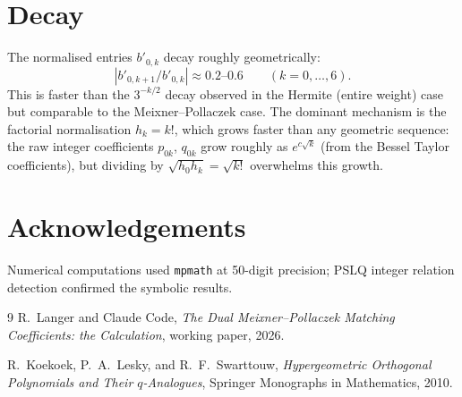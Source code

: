 \documentclass[11pt,a4paper]{article}
\begin{document}
\section{Decay}

The normalised entries $b'_{0,k}$ decay roughly geometrically:
\[
  |b'_{0,k+1}/b'_{0,k}| \approx 0.2\text{--}0.6
  \qquad (k = 0,\ldots,6).
\]
This is faster than the $3^{-k/2}$ decay observed in the Hermite
(entire weight) case but comparable to the Meixner--Pollaczek case.
The dominant mechanism is the factorial normalisation $h_k = k!$,
which grows faster than any geometric sequence: the raw integer
coefficients $p_{0k}$, $q_{0k}$ grow roughly as $e^{c\sqrt{k}}$ (from
the Bessel Taylor coefficients), but dividing by $\sqrt{h_0 h_k}
= \sqrt{k!}$ overwhelms this growth.

\section*{Acknowledgements}

Numerical computations used \texttt{mpmath} at 50-digit precision;
PSLQ integer relation detection confirmed the symbolic results.

\begin{thebibliography}{9}
 R.~Langer and Claude Code,
\emph{The Dual Meixner--Pollaczek Matching Coefficients: the Calculation},
working paper, 2026.

 R.~Koekoek, P.~A.~Lesky, and R.~F.~Swarttouw,
\emph{Hypergeometric Orthogonal Polynomials and Their $q$-Analogues},
Springer Monographs in Mathematics, 2010.
\end{thebibliography}
\end{document}
